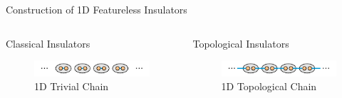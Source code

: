 \begin{frame}{Construction of 1D Featureless Insulators}
\vskip-1.5cm		
\begin{columns}[T]
	\begin{column}[T]{.5\textwidth}
		\begin{block}{Classical Insulators}
			\vskip0.55cm
			\begin{figure}
				\includegraphics[width=\linewidth] {diagrams/haldane_insulator_chain_trivial.pdf}
				\caption{1D Trivial Chain}
			\end{figure}
		\end{block}
	\end{column}
	\begin{column}[T]{.5\textwidth}
		\begin{block}{Topological Insulators}
			\vskip0.45cm
			\begin{figure}
				\includegraphics[width=\linewidth] {diagrams/haldane_insulator_chain.pdf}
				\caption{1D Topological Chain}
			\end{figure}
		\end{block}
	\end{column}
\end{columns}
\end{frame}

